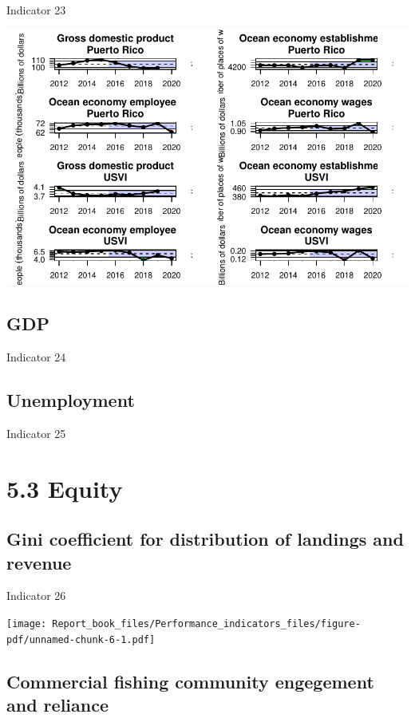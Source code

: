 \documentclass[
  letterpaper,
  oneside,
  open=any]{scrbook}
\begin{document}
Indicator 23

\includegraphics{Report_book_files/Performance_indicators_files/figure-pdf/unnamed-chunk-5-1.pdf}

\subsection{GDP}\label{gdp}

Indicator 24

\subsection{Unemployment}\label{unemployment}

Indicator 25

\section{5.3 Equity}\label{equity}

\subsection{Gini coefficient for distribution of landings and
revenue}\label{gini-coefficient-for-distribution-of-landings-and-revenue}

Indicator 26

\texttt{[image: Report\_book\_files/Performance\_indicators\_files/figure-pdf/unnamed-chunk-6-1.pdf]}

\subsection{Commercial fishing community engegement and
reliance}\label{commercial-fishing-community-engegement-and-reliance}
\end{document}
